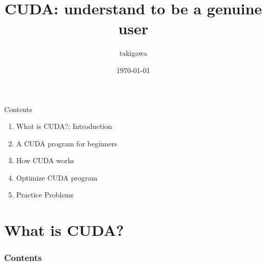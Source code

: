 \documentclass[dvipdfmx, 11pt, aspectratio=169]{beamer}   %
\title{CUDA: understand to be a genuine user}
\author{takigawa}
\institute{The university of Tokyo, EEIC, Taura Lab}
\date{\today}
\begin{document}
\begin{frame}
  \titlepage       
\end{frame}
\begin{frame}{Contents}
  \begin{enumerate}%
    \item What is CUDA?: Introduction
    \item A CUDA program for beginners
    \item How CUDA works
    \item Optimize CUDA program
    \item Practice Problems
  \end{enumerate}
\end{frame}
\section{What is CUDA?}
\begin{frame}
    \frametitle{Contents}
    \linespread{0.6}\selectfont
\end{frame}
\end{document}
